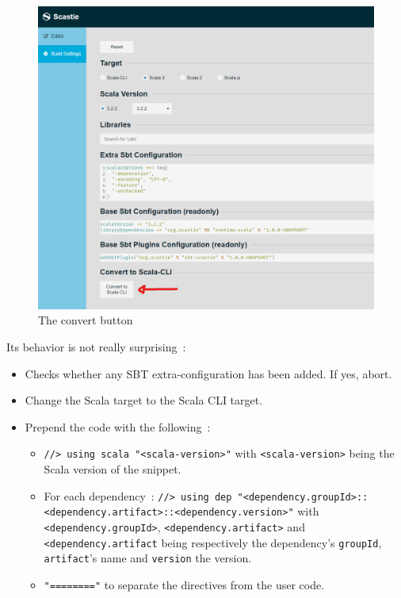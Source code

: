 \documentclass{article}
\begin{document}
\begin{figure}[H]
    \centering
    \includegraphics[width=\linewidth]{./scastie_convert.png}
    \caption{The convert button}
\end{figure}

Its behavior is not really surprising~:

\begin{itemize}
    \item Checks whether any SBT extra-configuration has been added. If yes, abort.
    \item Change the Scala target to the Scala CLI target.
    \item Prepend the code with the following~:
    \begin{itemize}
        \item \lstinline{//> using scala "<scala-version>"} with \lstinline{<scala-version>} being the Scala version of the snippet.
        \item For each dependency~: \lstinline{//> using dep "<dependency.groupId>::<dependency.artifact>::<dependency.version>"} with \lstinline{<dependency.groupId>}, \lstinline{<dependency.artifact>} and \lstinline{<dependency.artifact} being respectively the dependency's \lstinline{groupId}, \lstinline{artifact}'s name and \lstinline{version} the version.
        \item \lstinline{"========"} to separate the directives from the user code.
    \end{itemize}
\end{itemize}
\end{document}
